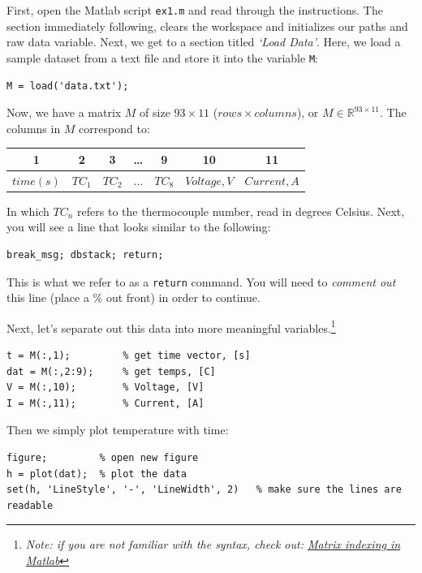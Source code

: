 \documentclass[11pt, letterpaper]{article}
\begin{document}
\noindent
First, open the Matlab script \texttt{ex1.m} and read through the instructions. The section immediately following, clears the workspace and initializes our paths and raw data variable. Next, we get to a section titled \textit{`Load Data'}. Here, we load a sample dataset from a text file and store it into the variable \texttt{M}:
\n
\begin{lstlisting}[numbers=none]
% load tab separated data
M = load('data.txt'); 
\end{lstlisting}
\n
Now, we have a matrix $M$ of size $93 \times 11$ ($rows \times columns$), or $M \in \mathbb{R}^{93 \times 11}$. The columns in $M$ correspond to:
\\
{\small
\begin{center}\renewcommand{\arraystretch}{1.5}
\begin{tabular}{|c | c | c | c | c | c | c |}
\hline
\rowcolor{light-gray}
    1 & 2 & 3 & \dots & 9 & 10 & 11 \\ 
    \hline
   \cellcolor{green!10} $time (s)$ & \cellcolor{red!10}$TC_1$ & \cellcolor{red!10}$TC_2$ & \cellcolor{red!10}$\dots$ & \cellcolor{red!10}$TC_8$ & \cellcolor{orange!10}$Voltage, V$ & \cellcolor{orange!10}$Current, A$ \\ 
\hline
\end{tabular}
\end{center}
}

In which $TC_n$ refers to the thermocouple number, read in degrees Celsius. Next, you will see a line that looks similar to the following:
\n
\begin{lstlisting}[numbers=none]
% COMMENT ME OUT!!
break_msg; dbstack; return;
\end{lstlisting}

\n
This is what we refer to as a \texttt{return} command. You will need to \textit{comment out} this line (place a \% out front) in order to continue. 

\n
Next, let's separate out this data into more meaningful variables.\footnote{\textit{Note: if you are not familiar with the syntax, check out: \href{https://www.mathworks.com/company/newsletters/articles/matrix-indexing-in-matlab.html}{Matrix indexing in Matlab}  }} 
\n
\begin{lstlisting}[numbers=none]
t = M(:,1);         % get time vector, [s]
dat = M(:,2:9);     % get temps, [C]
V = M(:,10);        % Voltage, [V]
I = M(:,11);        % Current, [A]
\end{lstlisting}

\n
Then we simply plot temperature with time:
\n
\begin{minipage}{\linewidth}
\begin{lstlisting}[numbers=none]
figure;         % open new figure
h = plot(dat);  % plot the data
set(h, 'LineStyle', '-', 'LineWidth', 2)   % make sure the lines are readable
\end{lstlisting}
\end{minipage}
\end{document}
